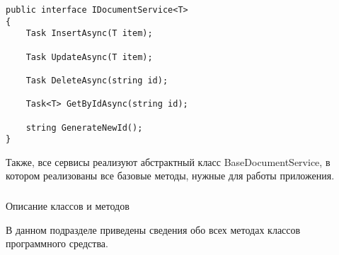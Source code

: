 \lstset{style=sharpc}
\begin{lstlisting}
public interface IDocumentService<T>
{
	Task InsertAsync(T item);

	Task UpdateAsync(T item);

	Task DeleteAsync(string id);

	Task<T> GetByIdAsync(string id);

	string GenerateNewId();
}
\end{lstlisting}

Также, все сервисы реализуют абстрактный класс BaseDocumentService, в котором реализованы все базовые методы, нужные для работы приложения.

\subsubsection{} Описание классов и методов
\label{sec:design:server:methods}

В данном подразделе приведены сведения обо всех методах классов программного средства.

